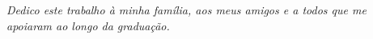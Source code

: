 \null\vfill
\hfill\begin{minipage}{0.90\textwidth}
\textit{Dedico este trabalho à minha família, aos meus amigos e a todos que me apoiaram ao longo da graduação.}
\end{minipage}
\vspace{1cm}
